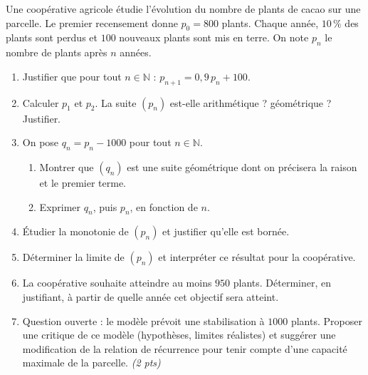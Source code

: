\documentclass[11pt]{article}
\begin{document}
\begin{exercice}
Une coopérative agricole étudie l'évolution du nombre de plants de cacao sur une parcelle. Le premier recensement donne $p_0 = 800$ plants. Chaque année, $10\,\%$ des plants sont perdus et $100$ nouveaux plants sont mis en terre. On note $p_n$ le nombre de plants après $n$ années.
\begin{enumerate}
\item Justifier que pour tout $n \in \mathbb{N}$ : $p_{n+1} = 0{,}9\,p_n + 100$.
\item Calculer $p_1$ et $p_2$. La suite $(p_n)$ est-elle arithmétique ? géométrique ? Justifier.
\item On pose $q_n = p_n - 1000$ pour tout $n \in \mathbb{N}$.
\begin{enumerate}
\item Montrer que $(q_n)$ est une suite géométrique dont on précisera la raison et le premier terme.
\item Exprimer $q_n$, puis $p_n$, en fonction de $n$.
\end{enumerate}
\item Étudier la monotonie de $(p_n)$ et justifier qu'elle est bornée.
\item Déterminer la limite de $(p_n)$ et interpréter ce résultat pour la coopérative.
\item La coopérative souhaite atteindre au moins $950$ plants. Déterminer, en justifiant, à partir de quelle année cet objectif sera atteint.
\item Question ouverte : le modèle prévoit une stabilisation à $1000$ plants. Proposer une critique de ce modèle (hypothèses, limites réalistes) et suggérer une modification de la relation de récurrence pour tenir compte d'une capacité maximale de la parcelle. \emph{(2 pts)}
\end{enumerate}
\end{exercice}
\end{document}
